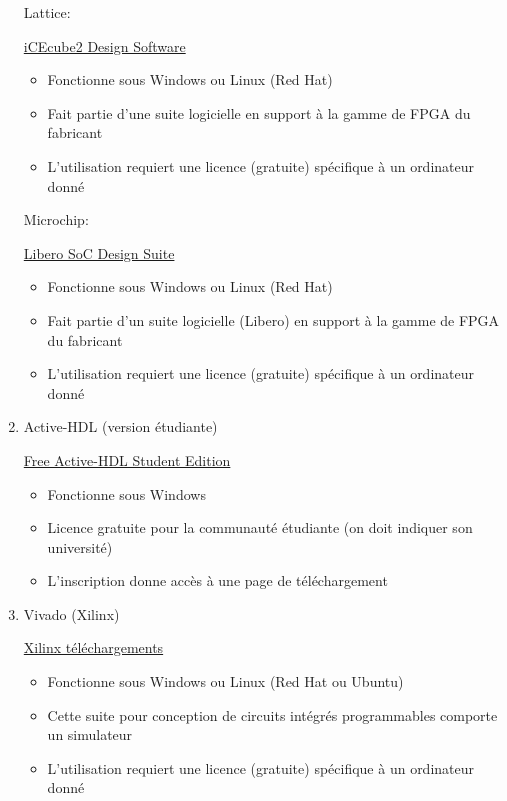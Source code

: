 \documentclass[letter, oneside]{book}
\begin{document}
\begin{enumerate}
Lattice:

\href{http://www.latticesemi.com/icecube2}{iCEcube2 Design Software}

\begin{itemize}
\item Fonctionne sous Windows ou Linux (Red Hat)
\item Fait partie d'une suite logicielle en support à la gamme de FPGA du
fabricant
\item L'utilisation requiert une licence (gratuite) spécifique à un
ordinateur donné
\end{itemize}

Microchip:

\href{https://www.microchip.com/en-us/products/fpgas-and-plds/fpga-and-soc-design-tools/fpga/libero-software-later-versions\#downloads}{Libero SoC Design Suite}

\begin{itemize}
\item Fonctionne sous Windows ou Linux (Red Hat)
\item Fait partie d'un suite logicielle (Libero) en support à la gamme de
FPGA du fabricant
\item L'utilisation requiert une licence (gratuite) spécifique à un
ordinateur donné
\end{itemize}

\item Active-HDL (version étudiante)
\label{sec:org75d908d}

\href{https://www.aldec.com/en/products/fpga\_simulation/active\_hdl\_student}{Free Active-HDL Student Edition}

\begin{itemize}
\item Fonctionne sous Windows
\item Licence gratuite pour la communauté étudiante (on doit indiquer son université)
\item L'inscription donne accès à une page de téléchargement
\end{itemize}

\item Vivado (Xilinx)
\label{sec:org85389b6}

\href{https://www.xilinx.com/support/download.html}{Xilinx téléchargements}

\begin{itemize}
\item Fonctionne sous Windows ou Linux (Red Hat ou Ubuntu)
\item Cette suite pour conception de circuits intégrés programmables
comporte un simulateur
\item L'utilisation requiert une licence (gratuite) spécifique à un
ordinateur donné
\end{itemize}


\end{enumerate}
\end{document}
